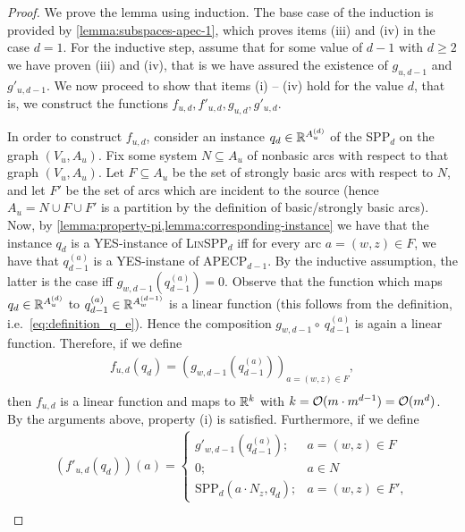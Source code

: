\begin{proof}
    We prove the lemma using induction. The base case of the induction is provided by \cref{lemma:subspaces-apec-1}, which proves items (iii) and (iv) in the case $d = 1$. For the inductive step, assume that for some value of $d - 1$ with  $d \geq 2$ we have proven (iii) and (iv), that is we have assured the existence of $g_{u,d-1}$ and $g'_{u,d-1}$. We now proceed to show that items (i) -- (iv) hold for the value $d$, that is, we construct the functions $f_{u,d}, f'_{u,d}, g_{u,d}, g'_{u,d}$.

    In order to construct $f_{u,d}$, consider an instance $q_d \in \mathbb{R}^{A_u^{(d)}}$ of the SPP$_d$ on the graph $(V_u, A_u)$. Fix some system $N \subseteq A_u$ of nonbasic arcs with respect to that graph $(V_u, A_u)$. Let $F \subseteq A_u$ be the set of strongly basic arcs with respect to $N$, and let $F'$ be the set of arcs which are incident to the source (hence $A_u = N \cup F \cup F'$ is a partition by the definition of basic/strongly basic arcs). Now, by \cref{lemma:property-pi,lemma:corresponding-instance} we have that the instance $q_d$ is a YES-instance of \textsc{Lin}SPP$_d$ iff for every arc $a = (w,z) \in F$, we have that $q^{(a)}_{d-1}$ is a YES-instane of APECP$_{d-1}$. By the inductive assumption, the latter is the case iff  $g_{w,d-1}(q^{(a)}_{d-1}) = 0$. Observe that the function which maps $q_d \in \mathbb{R}^{A_u^{(d)}}$ to $q^{(a)}_{d-1} \in \mathbb{R}^{A_w^{(d-1)}}$ is a linear function (this follows from the definition, i.e.\ \cref{eq:definition_q_e}). Hence the composition $g_{w,d-1} \circ\ q^{(a)}_{d-1}$ is again a linear function. Therefore, if we define
    \begin{align*}
        f_{u,d}(q_d) = (g_{w,d-1}(q^{(a)}_{d-1}))_{a = (w,z) \in F}, \\
    \end{align*}
    then $f_{u,d}$ is a linear function and maps to $\mathbb{R}^k$ with $k = \mathcal{O}(m \cdot m^{d-1}) = \mathcal{O}(m^d)$. By the arguments above, property (i) is satisfied. Furthermore, if we define
    \begin{align*}
        (f'_{u,d}(q_d))(a) = \begin{cases}
            g'_{w,d-1}(q^{(a)}_{d-1}); & a = (w,z) \in F\\
            0; & a \in N\\
            \text{SPP}_d(a \cdot N_z, q_d); & a = (w,z) \in F',
        \end{cases} \\
    \end{align*}

\end{proof}
